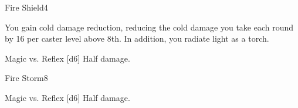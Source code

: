 \begin{spellsection}{Fire Shield}{4}
\begin{spellheader}
\end{spellheader}
\begin{spellcontent}
    \begin{spelleffects}
        \spelleffect You gain cold damage reduction, reducing the cold damage you take each round by 16  per caster level above 8th. In addition, you radiate light as a torch.
        \spelldur \durshort \dismissable
    \end{spelleffects}
\end{spellcontent}
\begin{spellsubcontent}
    \begin{spelltargetinginfo}
    \end{spelltargetinginfo}
    \begin{spelleffects}
        \begin{spellattack}{Magic vs. Reflex}
            \spellsuccess {}[d6]
            \spellfailure Half damage.
        \end{spellattack}
    \end{spelleffects}
\end{spellsubcontent}
\begin{spellfooter}
\end{spellfooter}
\end{spellsection}

\begin{spellsection}{Fire Storm}{8}
\begin{spellheader}
\end{spellheader}
\begin{spellcontent}
    \begin{spelltargetinginfo}
    \end{spelltargetinginfo}
    \begin{spelleffects}
        \begin{spellattack}{Magic vs. Reflex}
            \spellsuccess {}[d6]
            \spellfailure Half damage.
        \end{spellattack}
    \end{spelleffects}
\end{spellcontent}
\begin{spellfooter}
\end{spellfooter}
\end{spellsection}

